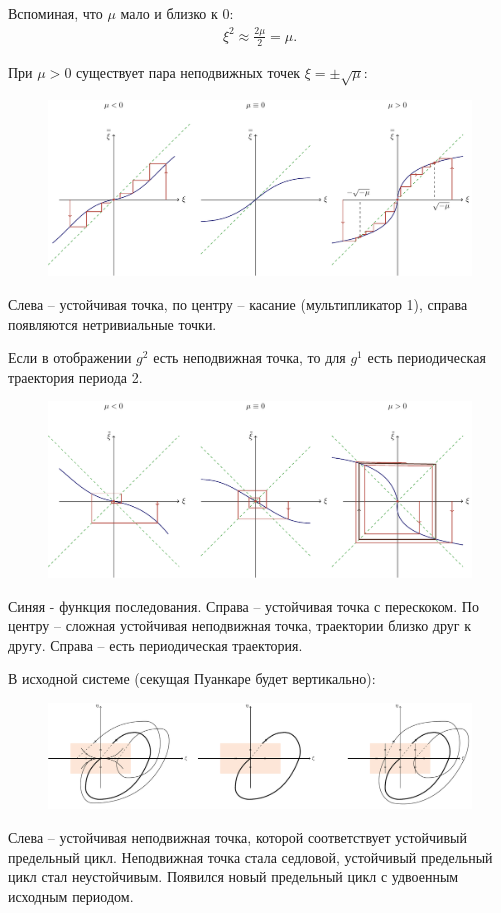Вспоминая, что $\mu$ мало и близко к 0:
\begin{gather*}
	\xi^2 \approx \frac{2\mu}{2}=\mu.
\end{gather*}

При $\mu>0$ существует пара неподвижных точек $\xi=\pm \sqrt{\mu}$:
\begin{figure}[H]
	\centering
	\includegraphics[width=1\linewidth]{fig/fig68.pdf}   
\end{figure}
Слева -- устойчивая точка, по центру -- касание (мультипликатор 1), справа появляются нетривиальные точки.

Если в отображении $g^2$ есть неподвижная точка, то для $g^1$ есть периодическая траектория периода 2.
\begin{figure}[H]
	\centering
	\includegraphics[width=1\linewidth]{fig/fig69.pdf}   
\end{figure}
Синяя - функция последования. Справа -- устойчивая точка с перескоком. По центру -- сложная устойчивая неподвижная точка, траектории близко друг к другу. Справа -- есть периодическая траектория.

В исходной системе (секущая Пуанкаре будет вертикально):
\begin{figure}[H]
	\centering
	\includegraphics[width=1\linewidth]{fig/fig70.pdf}   
\end{figure}
Слева -- устойчивая неподвижная точка, которой соответствует устойчивый предельный цикл. Неподвижная точка стала седловой, устойчивый предельный цикл стал неустойчивым. Появился новый предельный цикл с удвоенным исходным периодом. 

